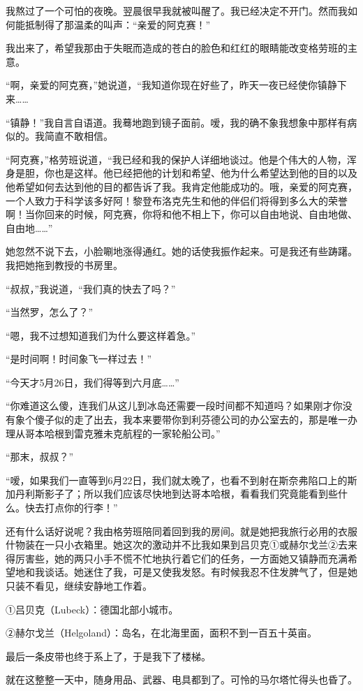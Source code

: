 \documentclass[10pt]{book}
\begin{document}
我熬过了一个可怕的夜晚。翌晨很早我就被叫醒了。我已经决定不开门。然而我如何能抵制得了那温柔的叫声：“亲爱的阿克赛！”

我出来了，希望我那由于失眠而造成的苍白的脸色和红红的眼睛能改变格劳班的主意。

“啊，亲爱的阿克赛，”她说道，“我知道你现在好些了，昨天一夜已经使你镇静下来……

“镇静！”我自言自语道。我蓦地跑到镜子面前。嗳，我的确不象我想象中那样有病似的。我简直不敢相信。

“阿克赛，”格劳班说道，“我已经和我的保护人详细地谈过。他是个伟大的人物，浑身是胆，你也是这样。他已经把他的计划和希望、他为什么希望达到他的目的以及他希望如何去达到他的目的都告诉了我。我肯定他能成功的。哦，亲爱的阿克赛，一个人致力于科学该多好阿！黎登布洛克先生和他的伴侣们将得到多么大的荣誉啊！当你回来的时候，阿克赛，你将和他不相上下，你可以自由地说、自由地做、自由地……”

她忽然不说下去，小脸唰地涨得通红。她的话使我振作起来。可是我还有些踌躇。我把她拖到教授的书房里。

“叔叔，”我说道，“我们真的快去了吗？”

“当然罗，怎么了？”

“嗯，我不过想知道我们为什么要这样着急。”

“是时间啊！时间象飞一样过去！”

“今天才5月26日，我们得等到六月底……”

“你难道这么傻，连我们从这儿到冰岛还需要一段时间都不知道吗？如果刚才你没有象个傻子似的走了出去，我本来要带你到利芬德公司的办公室去的，那是唯一办理从哥本哈根到雷克雅未克航程的一家轮船公司。”

“那末，叔叔？”

“嗳，如果我们一直等到6月22日，我们就太晚了，也看不到射在斯奈弗陷口上的斯加丹利斯影子了；所以我们应该尽快地到达哥本哈根，看看我们究竟能看到些什么。快去打点你的行李！”

还有什么话好说呢？我由格劳班陪同着回到我的房间。就是她把我旅行必用的衣服什物装在一只小衣箱里。她这次的激动并不比我如果到吕贝克①或赫尔戈兰②去来得厉害些，她的两只小手不慌不忙地执行着它们的任务，一方面她又镇静而充满希望地和我谈话。她迷住了我，可是又使我发怒。有时候我忍不住发脾气了，但是她只装不看见，继续安静地工作着。

①吕贝克（Lubeck）：德国北部小城市。

②赫尔戈兰（Helgoland）：岛名，在北海里面，面积不到一百五十英亩。

最后一条皮带也终于系上了，于是我下了楼梯。

就在这整整一天中，随身用品、武器、电具都到了。可怜的马尔塔忙得头也昏了。
\end{document}

